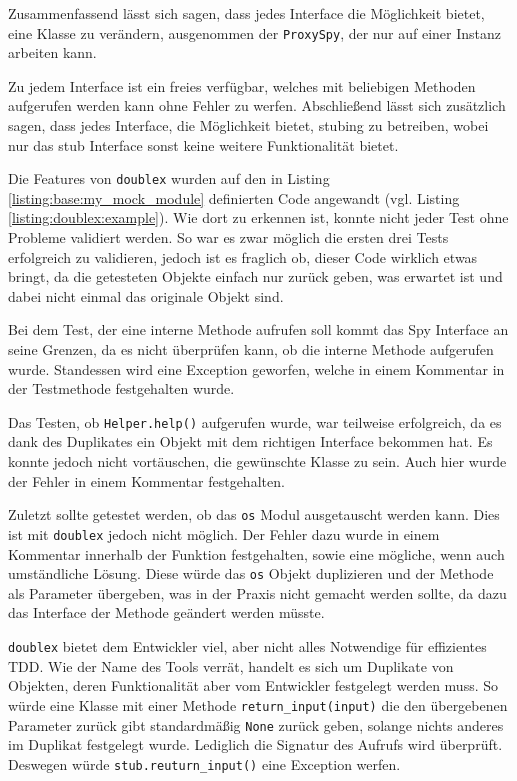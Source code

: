 Zusammenfassend lässt sich sagen, dass jedes Interface die Möglichkeit bietet, 
eine
Klasse zu verändern, ausgenommen der \lstinline{ProxySpy}, der nur auf einer
Instanz arbeiten kann.

Zu jedem Interface ist ein freies verfügbar, welches mit beliebigen
Methoden aufgerufen werden kann ohne Fehler zu werfen. Abschließend lässt sich
zusätzlich sagen, dass jedes Interface, die Möglichkeit bietet,
\gls{stub}ing zu betreiben, wobei nur das \Gls{stub} Interface sonst keine
weitere Funktionalität bietet.
\newline

Die Features von \lstinline{doublex} wurden auf den in Listing
\ref{listing:base:my_mock_module} definierten Code angewandt (vgl. Listing
\ref{listing:doublex:example}). Wie dort zu erkennen ist, konnte nicht jeder
Test ohne Probleme validiert werden. So war es zwar möglich die ersten drei
Tests erfolgreich zu validieren, jedoch ist es fraglich ob, dieser Code
wirklich etwas bringt, da die getesteten Objekte einfach nur zurück geben, was
erwartet ist und dabei nicht einmal das originale Objekt sind.

Bei dem Test, der eine interne Methode aufrufen soll kommt das Spy Interface an
seine Grenzen, da es nicht überprüfen kann, ob die interne Methode aufgerufen
wurde. Standessen wird eine Exception geworfen, welche in einem
Kommentar in der Testmethode festgehalten wurde.

Das Testen, ob \lstinline{Helper.help()} aufgerufen wurde, war teilweise
erfolgreich, da es dank des Duplikates ein Objekt mit dem richtigen Interface
bekommen hat. Es konnte jedoch nicht vortäuschen, die gewünschte Klasse zu sein.
Auch hier wurde der Fehler in einem Kommentar festgehalten.

Zuletzt sollte getestet werden, ob das \lstinline{os} Modul ausgetauscht werden
kann. Dies ist mit \lstinline{doublex} jedoch nicht möglich. Der Fehler
dazu wurde in einem Kommentar innerhalb der Funktion festgehalten, sowie eine
mögliche, wenn auch umständliche Lösung.
Diese würde das \lstinline{os} Objekt duplizieren und der Methode als
Parameter übergeben, was in der Praxis nicht gemacht werden
sollte, da dazu das Interface der Methode geändert werden müsste.
\newline

\lstinline{doublex} bietet dem Entwickler viel, aber nicht alles Notwendige für 
effizientes
TDD. Wie der Name des Tools verrät, handelt es sich um Duplikate von Objekten,
deren Funktionalität aber vom Entwickler festgelegt werden muss. So würde eine
Klasse mit einer Methode \lstinline{return_input(input)} die den übergebenen
Parameter zurück gibt standardmäßig \lstinline{None} zurück geben, solange
nichts anderes im Duplikat festgelegt wurde. Lediglich die Signatur des Aufrufs
wird überprüft. Deswegen würde \lstinline{stub.reuturn_input()} eine Exception
werfen.

